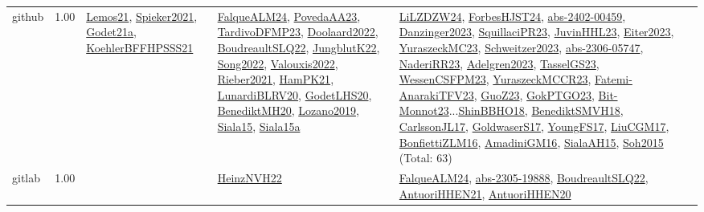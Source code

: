 {\begin{longtable}{p{3cm}r>{\raggedright\arraybackslash}p{6cm}>{\raggedright\arraybackslash}p{6cm}>{\raggedright\arraybackslash}p{8cm}}
\index{github}\index{Benchmarks!github}github &  1.00 & \hyperref[detail:Lemos21]{Lemos21}, \hyperref[detail:Spieker2021]{Spieker2021}, \hyperref[detail:Godet21a]{Godet21a}, \hyperref[detail:KoehlerBFFHPSSS21]{KoehlerBFFHPSSS21} & \hyperref[detail:FalqueALM24]{FalqueALM24}, \hyperref[detail:PovedaAA23]{PovedaAA23}, \hyperref[detail:TardivoDFMP23]{TardivoDFMP23}, \hyperref[detail:Doolaard2022]{Doolaard2022}, \hyperref[detail:BoudreaultSLQ22]{BoudreaultSLQ22}, \hyperref[detail:JungblutK22]{JungblutK22}, \hyperref[detail:Song2022]{Song2022}, \hyperref[detail:Valouxis2022]{Valouxis2022}, \hyperref[detail:Rieber2021]{Rieber2021}, \hyperref[detail:HamPK21]{HamPK21}, \hyperref[detail:LunardiBLRV20]{LunardiBLRV20}, \hyperref[detail:GodetLHS20]{GodetLHS20}, \hyperref[detail:BenediktMH20]{BenediktMH20}, \hyperref[detail:Lozano2019]{Lozano2019}, \hyperref[detail:Siala15]{Siala15}, \hyperref[detail:Siala15a]{Siala15a} & \hyperref[detail:LiLZDZW24]{LiLZDZW24}, \hyperref[detail:ForbesHJST24]{ForbesHJST24}, \hyperref[detail:abs-2402-00459]{abs-2402-00459}, \hyperref[detail:Danzinger2023]{Danzinger2023}, \hyperref[detail:SquillaciPR23]{SquillaciPR23}, \hyperref[detail:JuvinHHL23]{JuvinHHL23}, \hyperref[detail:Eiter2023]{Eiter2023}, \hyperref[detail:YuraszeckMC23]{YuraszeckMC23}, \hyperref[detail:Schweitzer2023]{Schweitzer2023}, \hyperref[detail:abs-2306-05747]{abs-2306-05747}, \hyperref[detail:NaderiRR23]{NaderiRR23}, \hyperref[detail:Adelgren2023]{Adelgren2023}, \hyperref[detail:TasselGS23]{TasselGS23}, \hyperref[detail:WessenCSFPM23]{WessenCSFPM23}, \hyperref[detail:YuraszeckMCCR23]{YuraszeckMCCR23}, \hyperref[detail:Fatemi-AnarakiTFV23]{Fatemi-AnarakiTFV23}, \hyperref[detail:GuoZ23]{GuoZ23}, \hyperref[detail:GokPTGO23]{GokPTGO23}, \hyperref[detail:Bit-Monnot23]{Bit-Monnot23}...\hyperref[detail:ShinBBHO18]{ShinBBHO18}, \hyperref[detail:BenediktSMVH18]{BenediktSMVH18}, \hyperref[detail:CarlssonJL17]{CarlssonJL17}, \hyperref[detail:GoldwaserS17]{GoldwaserS17}, \hyperref[detail:YoungFS17]{YoungFS17}, \hyperref[detail:LiuCGM17]{LiuCGM17}, \hyperref[detail:BonfiettiZLM16]{BonfiettiZLM16}, \hyperref[detail:AmadiniGM16]{AmadiniGM16}, \hyperref[detail:SialaAH15]{SialaAH15}, \hyperref[detail:Soh2015]{Soh2015} (Total: 63)\\
\index{gitlab}\index{Benchmarks!gitlab}gitlab &  1.00 &  & \hyperref[detail:HeinzNVH22]{HeinzNVH22} & \hyperref[detail:FalqueALM24]{FalqueALM24}, \hyperref[detail:abs-2305-19888]{abs-2305-19888}, \hyperref[detail:BoudreaultSLQ22]{BoudreaultSLQ22}, \hyperref[detail:AntuoriHHEN21]{AntuoriHHEN21}, \hyperref[detail:AntuoriHHEN20]{AntuoriHHEN20}\\

\end{longtable}}
